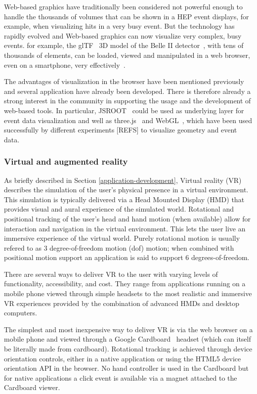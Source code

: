 \documentclass[12pt,a4paper]{article}
\begin{document}
Web-based graphics have traditionally been considered not powerful enough to handle the thousands of volumes that can be
shown in a HEP event displays, for example, when visualizing hits in a very busy event. But the technology has rapidly
evolved and Web-based graphics can now visualize very complex, busy events.
for example, the glTF~\cite{glTF} 3D model of the Belle II detector~\cite{BelleII}, with tens of thousands of elements,
can be loaded, viewed and manipulated in a web browser, even on a smartphone, very effectively~\cite{SketchFabBelleII}.


The advantages of visualization in the browser have been mentioned
previously and several application have already been developed.
There is therefore already a strong interest in the community in supporting the usage and the development of web-based tools.
In particular, JSROOT~\cite{rootjs} could be used as
underlying layer for event data visualization and well as three.js~\cite{ThreeJS} and WebGL~\cite{WebGL2011}, which have been
used successfully by different experiments [REFS] to visualize geometry and event data.

\hypertarget{vr}{%
\subsubsection{Virtual and augmented reality}\label{vr}}

As briefly described in Section \ref{application-development}, Virtual reality (VR) describes the simulation of the user’s
physical presence in a virtual environment. This simulation
is typically delivered via a Head Mounted Display (HMD) that provides visual and aural experience of the simulated world.
Rotational and positional tracking of the user’s head and hand motion (when available) allow for interaction and navigation
in the virtual environment. This lets the user live an immersive experience of the virtual world. Purely rotational motion is usually refered to as
3 degree-of-freedom motion (dof) motion; when combined with positional motion support an application is said to support 6 degrees-of-freedom.

There are several ways to deliver VR to the user with varying levels of functionality, accessibility, and cost.
They range from applications running on a mobile phone viewed through simple headsets to the most realistic and
immersive VR experiences provided by the combination of advanced HMDs and desktop computers.

The simplest and most inexpensive way to deliver VR is via the web browser on a mobile phone and viewed through a
Google Cardboard~\cite{GoogleCardboard} headset (which can itself be literally made from cardboard).
Rotational tracking is achieved through device orientation
controls, either in a native application or using the HTML5 device orientation API in the browser. No hand controller is
used in the Cardboard but for native applications a click event is available via a magnet attached to the Cardboard viewer.
\end{document}
